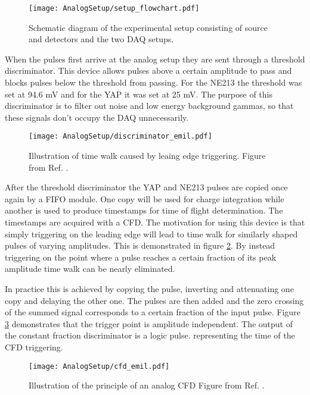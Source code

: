 \documentclass[main.tex]{subfiles}
\begin{document}
\begin{figure}[h]
    \centering
        \texttt{[image: AnalogSetup/setup\_flowchart.pdf]}
        \caption[Diagram of experimental setup]{Schematic diagram of the experimental setup consisting of source and detectors and the two DAQ setups.}
    \label{fig:setup}
\end{figure}

When the pulses first arrive at the analog setup they are sent through a threshold discriminator. This device allows pulses above a certain amplitude to pass and blocks pulses below the threshold from passing. For the NE213 the threshold was set at 94.6 mV and for the YAP it was set at 25 mV. The purpose of this discriminator is to filter out noise and low energy background gammas, so that these signals don't occupy the DAQ unnecessarily.
\begin{figure}[h]
    \centering
        \texttt{[image: AnalogSetup/discriminator\_emil.pdf]}
        \caption[Threshold discriminators and time walk]{Illustration of time walk caused by leaing edge triggering. Figure from Ref. \cite{rofors}.}
    \label{fig:discriminator}
\end{figure}
After the threshold discriminator the YAP and NE213 pulses are copied once again by a FIFO module. One copy will be used for charge integration while another is used to produce timestamps for time of flight determination. The timestamps are acquired with a CFD. The motivation for using this device is that simply triggering on the leading edge will lead to time walk for similarly shaped pulses of varying amplitudes. This is demonstrated in figure \ref{fig:discriminator}. By instead triggering on the point where a pulse reaches a certain fraction of its peak amplitude time walk can be nearly eliminated\citep[pg.327]{Leo}.

In practice this is achieved by copying the pulse, inverting and attenuating one copy and delaying the other one. The pulses are then added and the zero crossing of the summed signal corresponds to a certain fraction of the input pulse. Figure \ref{fig:cfd} demonstrates that the trigger point is amplitude independent. The output of the constant fraction discriminator is a logic pulse. representing the time of the CFD triggering.


\begin{figure}[h]
    \centering
        \texttt{[image: AnalogSetup/cfd\_emil.pdf]}
        \caption[CFD trigger principle]{Illustration of the principle of an analog CFD Figure from Ref. \cite{rofors}.}
    \label{fig:cfd}
\end{figure}
\end{document}
